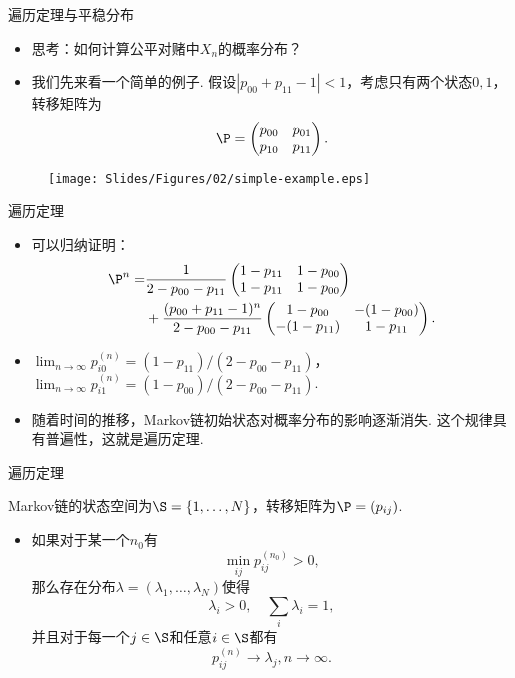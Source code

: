 \begin{frame}{遍历定理与平稳分布}
\begin{itemize}
	\item 思考：如何计算公平对赌中$X_n$的概率分布？
	\item 我们先来看一个简单的例子. 假设$|p_{00}+p_{11}-1|<1$，考虑只有两个状态$0,1$，转移矩阵为
	\[\P=\begin{pmatrix}p_{00}&p_{01}\\p_{10}&p_{11}
	\end{pmatrix}.\]
\end{itemize}
\begin{figure}
    \centering
    \texttt{[image: Slides/Figures/02/simple-example.eps]}
\end{figure}
\end{frame}

\begin{frame}{遍历定理}
\begin{itemize}
	\item 可以归纳证明：
	\begin{align*}
	    \P^n=&\frac{1}{2-p_{00}-p_{11}}\begin{pmatrix}1-p_{11}&1-p_{00}\\1-p_{11}&1-p_{00}\end{pmatrix}\\
	    &+\frac{(p_{00}+p_{11}-1)^n}{2-p_{00}-p_{11}}\begin{pmatrix}1-p_{00}&-(1-p_{00})\\-(1-p_{11})&1-p_{11}\end{pmatrix}.
	\end{align*}
	\item $\lim_{n\to\infty}p_{i0}^{(n)}=(1-p_{11})/(2-p_{00}-p_{11})$，$\lim_{n\to\infty}p_{i1}^{(n)}=(1-p_{00})/(2-p_{00}-p_{11})$.
	\item 随着时间的推移，Markov链初始状态对概率分布的影响逐渐消失. 这个规律具有普遍性，这就是遍历定理.
\end{itemize}
\end{frame}

\begin{frame}{遍历定理}
\begin{theorem}
Markov链的状态空间为$\S=\{1,\dots,N\}$，转移矩阵为$\P=(p_{ij})$.
\begin{itemize}
    \item 如果对于某一个$n_0$有
    \begin{equation}
        \min_{ij}p_{ij}^{(n_0)}>0,\label{eq:reachable}
    \end{equation}
    那么存在分布$\lambda=(\lambda_1,\dots,\lambda_N)$使得
    \begin{equation}
        \lambda_i>0,\quad\sum_i\lambda_i=1,\label{eq:positive-distribution}
    \end{equation}
    并且对于每一个$j\in\S$和任意$i\in\S$都有
    \begin{equation}
    p_{ij}^{(n)}\to\lambda_j,n\to\infty.\label{eq:converge-to-limit}
    \end{equation}
\end{itemize}
\end{theorem}
\end{frame}

